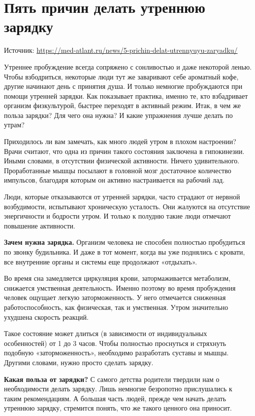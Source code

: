 \section{Пять причин делать утреннюю зарядку}
Источник: \url{https://med-atlant.ru/news/5-prichin-delat-utrennyuyu-zaryadku/}

Утреннее пробуждение всегда сопряжено с сонливостью и даже некоторой ленью. Чтобы взбодриться, некоторые люди тут же заваривают себе ароматный кофе, другие начинают день с принятия душа. И только немногие пробуждаются при помощи утренней зарядки. Как показывает практика, именно те, кто взбадривает организм физкультурой, быстрее переходят в активный режим. Итак, в чем же польза зарядки? Для чего она нужна? И какие упражнения лучше делать по утрам?

Приходилось ли вам замечать, как много людей утром в плохом настроении? Врачи считают, что одна из причин такого состояния заключена в гипокинезии. Иными словами, в отсутствии физической активности. Ничего удивительного. Проработанные мышцы посылают в головной мозг достаточное количество импульсов, благодаря которым он активно настраивается на рабочий лад.

Люди, которые отказываются от утренней зарядки, часто страдают от нервной возбудимости, испытывают хроническую усталость. Они жалуются на отсутствие энергичности и бодрости утром. И только к полудню такие люди отмечают повышение активности.

\textbf{Зачем нужна зарядка.}
Организм человека не способен полностью пробудиться по звонку будильника. И даже в тот момент, когда вы уже поднялись с кровати, все внутренние органы и системы еще продолжают «отдыхать».

Во время сна замедляется циркуляция крови, затормаживается метаболизм, снижается умственная деятельность. Именно поэтому во время пробуждения человек ощущает легкую заторможенность. У него отмечается сниженная работоспособность, как физическая, так и умственная. Утром значительно ухудшена скорость реакций.

Такое состояние может длиться (в зависимости от индивидуальных особенностей) от 1 до 3 часов. Чтобы полностью проснуться и стряхнуть подобную «заторможенность», необходимо разработать суставы и мышцы. Другими словами, нужно просто сделать зарядку.

\textbf{Какая польза от зарядки?}
С самого детства родители твердили нам о необходимости делать зарядку. Лишь немногие безропотно прислушались к таким рекомендациям. А большая часть людей, прежде чем начать делать утреннюю зарядку, стремится понять, что же такого ценного она приносит.

